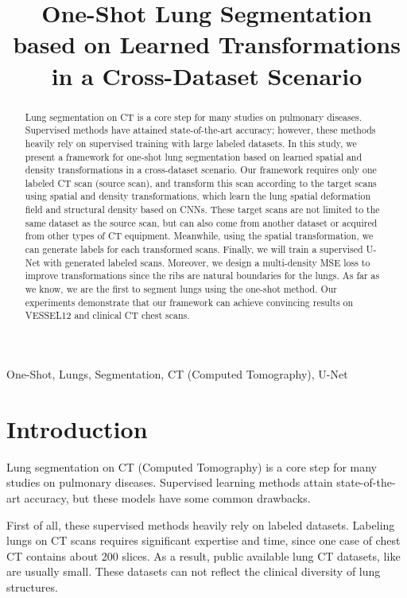 \documentclass{article}
\title{One-Shot Lung Segmentation based on Learned Transformations in a Cross-Dataset Scenario
  }
\begin{document}
%
\maketitle
\begin{abstract}
    Lung segmentation on CT  is a core step for many studies on pulmonary diseases. Supervised methods have attained state-of-the-art accuracy; however, these methods heavily rely on supervised training with large labeled datasets.
    In this study, we present a framework for one-shot lung segmentation based on learned spatial and density transformations in a cross-dataset scenario.
    Our framework requires only one labeled CT scan (source scan), and transform this scan according to the target scans using spatial and density transformations, which learn the lung spatial deformation field and structural density based on CNNs. These target scans are not limited to the same dataset as the source scan, but can also come from another dataset or acquired from other types of CT equipment. Meanwhile, using the spatial transformation, we can generate labels for each transformed scans. Finally, we will train a supervised U-Net with generated labeled scans.
    Moreover, we design a multi-density MSE loss to improve transformations since the ribs are natural boundaries for the lungs.
    As far as we know, we are the first to segment lungs using the one-shot method. Our experiments demonstrate that our framework can achieve convincing results on VESSEL12 and clinical CT chest scans.

\end{abstract}
%
\begin{keywords}
One-Shot, Lungs, Segmentation, CT (Computed Tomography), U-Net
\end{keywords}
%
\section{Introduction}
\label{sec:intro}

Lung segmentation on CT (Computed Tomography) is a core step for many studies on pulmonary diseases. Supervised learning methods attain state-of-the-art accuracy, but these models have some common drawbacks.

First of all, these supervised methods heavily rely on labeled datasets. Labeling lungs on CT scans requires significant expertise and time, since one case of chest CT contains about 200 slices. As a result, public available lung CT datasets, like \cite{rudyanto2014comparing, yang2017data} are usually small. These datasets can not reflect the clinical diversity of lung structures.
\end{document}
